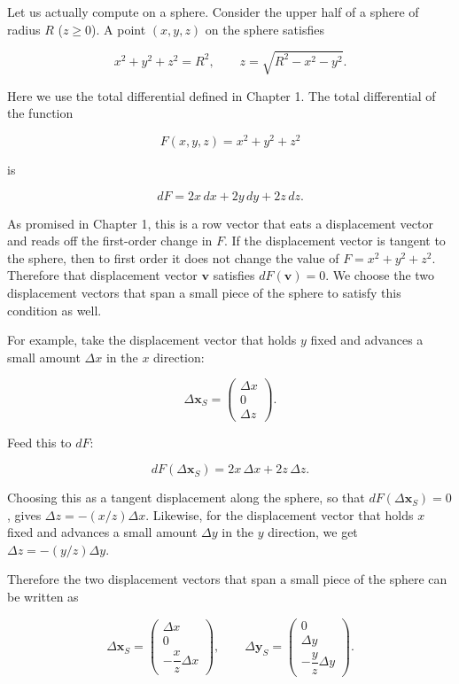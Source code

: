 Let us actually compute on a sphere. Consider the upper half of a sphere
of radius \(R\) (\(z \ge 0\)). A point \((x,y,z)\) on the sphere
satisfies

\[x^2+y^2+z^2=R^2,\qquad z=\sqrt{R^2-x^2-y^2}.\]

Here we use the total differential defined in Chapter 1. The total
differential of the function

\[F(x,y,z)=x^2+y^2+z^2\]

is

\[dF=2x\,dx+2y\,dy+2z\,dz.\]

As promised in Chapter 1, this is a row vector that eats a displacement
vector and reads off the first-order change in \(F\). If the
displacement vector is tangent to the sphere, then to first order it
does not change the value of \(F=x^2+y^2+z^2\). Therefore that
displacement vector \(\mathbf{v}\) satisfies \(dF(\mathbf{v})=0\). We
choose the two displacement vectors that span a small piece of the
sphere to satisfy this condition as well.

For example, take the displacement vector that holds \(y\) fixed and
advances a small amount \(\Delta x\) in the \(x\) direction:

\[\Delta\mathbf{x}_S=\begin{pmatrix}\Delta x\\[2pt]0\\[2pt]\Delta z\end{pmatrix}.\]

Feed this to \(dF\):

\[dF(\Delta\mathbf{x}_S)=2x\,\Delta x+2z\,\Delta z.\]

Choosing this as a tangent displacement along the sphere, so that
\(dF(\Delta\mathbf{x}_S)=0\), gives \(\Delta z=-(x/z)\Delta x\).
Likewise, for the displacement vector that holds \(x\) fixed and
advances a small amount \(\Delta y\) in the \(y\) direction, we get
\(\Delta z=-(y/z)\Delta y\).

Therefore the two displacement vectors that span a small piece of the
sphere can be written as

\[\Delta\mathbf{x}_S=\begin{pmatrix}\Delta x\\[2pt]0\\[2pt]-\dfrac{x}{z}\Delta x\end{pmatrix},\qquad
\Delta\mathbf{y}_S=\begin{pmatrix}0\\[2pt]\Delta y\\[2pt]-\dfrac{y}{z}\Delta y\end{pmatrix}.\]

